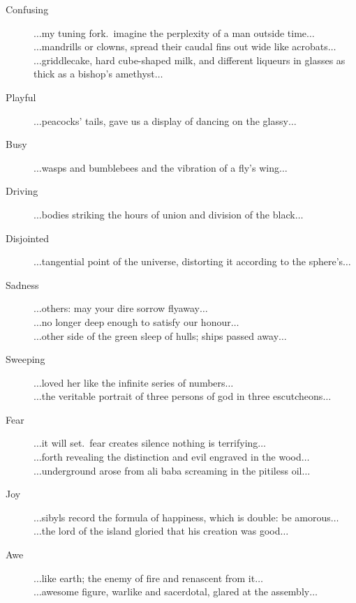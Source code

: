 \begin{description}
  \item [Confusing] $\ldots$my tuning fork.\ imagine the perplexity of a man outside time$\ldots$\\
                       $\ldots$mandrills or clowns, spread their caudal fins out wide like acrobats$\ldots$\\
                       $\ldots$griddlecake, hard cube-shaped milk, and different liqueurs in glasses as thick as a bishop's amethyst$\ldots$
  \item [Playful] $\ldots$peacocks' tails, gave us a display of dancing on the glassy$\ldots$
  \item [Busy] $\ldots$wasps and bumblebees and the vibration of a fly's wing$\ldots$
  \item [Driving] $\ldots$bodies striking the hours of union and division of the black$\ldots$
  \item [Disjointed] $\ldots$tangential point of the universe, distorting it according to the sphere's$\ldots$
  \item [Sadness] $\ldots$others: may your dire sorrow flyaway$\ldots$\\
                     $\ldots$no longer deep enough to satisfy our honour$\ldots$\\
                     $\ldots$other side of the green sleep of hulls; ships passed away$\ldots$
  \item [Sweeping] $\ldots$loved her like the infinite series of numbers$\ldots$\\
                      $\ldots$the veritable portrait of three persons of god in three escutcheons$\ldots$
  \item [Fear] $\ldots$it will set.\ fear creates silence nothing is terrifying$\ldots$\\
                 $\ldots$forth revealing the distinction and evil engraved in the wood$\ldots$\\
                 $\ldots$underground arose from ali baba screaming in the pitiless oil$\ldots$
  \item [Joy] $\ldots$sibyls record the formula of happiness, which is double: be amorous$\ldots$\\
                $\ldots$the lord of the island gloried that his creation was good$\ldots$
  \item [Awe] $\ldots$like earth; the enemy of fire and renascent from it$\ldots$\\
                $\ldots$awesome figure, warlike and sacerdotal, glared at the assembly$\ldots$\\

\end{description}
